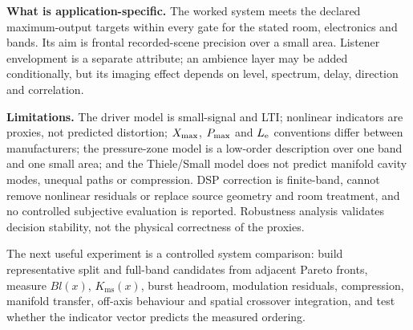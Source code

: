 \textbf{What is application-specific.} The worked system meets the
declared maximum-output targets within every gate for the stated room,
electronics and bands. Its aim is frontal recorded-scene precision over a
small area. Listener envelopment is a separate attribute; an ambience
layer may be added conditionally, but its imaging effect depends on level,
spectrum, delay, direction and correlation.

\textbf{Limitations.} The driver model is small-signal and LTI; nonlinear
indicators are proxies, not predicted distortion; $X_{\mathrm{max}}$, $P_{\mathrm{max}}$ and
$L_{\mathrm{e}}$ conventions differ between manufacturers; the pressure-zone model
is a low-order description over one band and one small area; and the
Thiele/Small model does not predict manifold cavity modes, unequal paths or
compression. DSP correction is finite-band, cannot remove nonlinear
residuals or replace source geometry and room treatment, and no controlled
subjective evaluation is reported. Robustness analysis validates decision
stability, not the physical correctness of the proxies.

The next useful experiment is a controlled system comparison: build
representative split and full-band candidates from adjacent Pareto fronts,
measure $Bl(x)$, $K_{\mathrm{ms}}(x)$, burst headroom, modulation
residuals, compression, manifold transfer, off-axis behaviour and spatial
crossover integration, and test whether the indicator vector predicts the
measured ordering.
